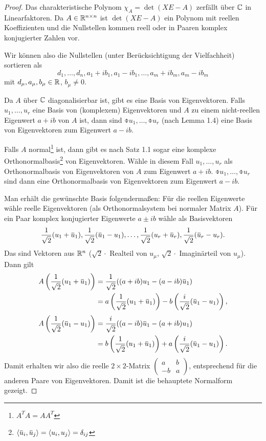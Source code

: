 \documentclass[
 a4paper,
 12pt,
 parskip=half
 ]{scrartcl}
\theoremstyle{plain}
\theoremstyle{definition}
\begin{document}
\begin{proof}
 Das charakteristische Polynom $\chi_A = \det ( XE - A )$ zerfällt über $\mathbb{C}$ in Linearfaktoren. Da $A \in \mathbb{R}^{n \times n}$ ist $\det(XE-A)$ ein Polynom mit reellen Koeffizienten und die Nullstellen kommen reell oder in Paaren komplex konjugierter Zahlen vor.
 
 Wir können also die Nullstellen (unter Berücksichtigung der Vielfachheit) sortieren als
 \[ d_1, \ldots, d_n, a_1 + i b_1, a_1 - i b_1, \ldots, a_m + i b_m, a_m - i b_m \]
 mit $d_\mu, a_\mu, b_\mu \in \mathbb{R}$, $b_\mu \ne 0$.
 
 Da $A$ über $\mathbb{C}$ diagonalisierbar ist, gibt es eine Basis von Eigenvektoren. Falls $u_1, \ldots, u_r$ eine Basis von (komplexem) Eigenvektoren und $A$ zu einem nicht-reellen Eigenwert $a + ib$ von $A$ ist, dann sind $\obar{u}_1, \ldots, \obar{u}_r$ (nach Lemma 1.4) eine Basis von Eigenvektoren zum Eigenwert $a - ib$. 
 
 Falls $A$ normal\footnote{$A^T A = A A^T$} ist, dann gibt es nach Satz 1.1 sogar eine komplexe Orthonormalbasis\footnote{$\scalar{\obar{u}_i, \obar{u}_j} = \scalar{u_i, u_j} = \delta_{ij}$} von Eigenvektoren. Wähle in diesem Fall $u_1, \ldots, u_r$ als Orthonormalbasis von Eigenvektoren von $A$ zum Eigenwert $a+ib$. $\obar{u}_1, \ldots, \obar{u}_r$ sind dann eine Orthonormalbasis von Eigenvektoren zum Eigenwert $a-ib$. 
 
 Man erhält die gewünschte Basis folgendermaßen: Für die reellen Eigenwerte wähle reelle Eigenvektoren (als Orthonormalsystem bei normaler Matrix $A$). Für ein Paar komplex konjugierter Eigenwerte $a \pm ib$ wähle als Basisvektoren
 \[ \rez{\sqrt{2}} ( u_1 + \obar{u}_1 ), \rez{\sqrt{2}} (\obar{u}_1 - u_1), \ldots, 
    \rez{\sqrt{2}} ( u_r + \obar{u}_r ), \rez{\sqrt{2}} (\obar{u}_r - u_r). \]
 Das sind Vektoren aus $\mathbb{R}^n$ ($\sqrt{2} \cdot$ Realteil von $u_\mu$, $\sqrt{2} \cdot$ Imaginärteil von $u_\mu$). Dann gilt
 \begin{align*}
 A \left( \rez{\sqrt{2}} ( u_1 + \obar{u}_1 ) \right) 
      &= \rez{\sqrt{2}} ( (a +ib) u_1 - (a-ib) \obar{u}_1 ) \\
      &= a \left( \rez{\sqrt{2}} ( u_1 + \obar{u}_1 ) \right ) 
       - b \left( \frac{i}{\sqrt{2}}( \obar{u}_1 - u_1 ) \right),
 \end{align*}
 \begin{align*}
  A \left( \rez{\sqrt{2}} ( \obar{u}_1 - u_1 ) \right) 
      &= \frac{i}{\sqrt{2}} ( (a -ib) \obar{u}_1 - (a+ib) u_1 ) \\
      &= b \left( \rez{\sqrt{2}} ( u_1 + \obar{u}_1 ) \right ) 
       + a \left( \frac{i}{\sqrt{2}}( \obar{u}_1 - u_1 ) \right).
 \end{align*}
 Damit erhalten wir also die reelle $2 \times 2$-Matrix $\begin{pmatrix} a & b \\ -b & a \end{pmatrix}$, entsprechend für die anderen Paare von Eigenvektoren. Damit ist die behauptete Normalform gezeigt.
 

\end{proof}
\end{document}
